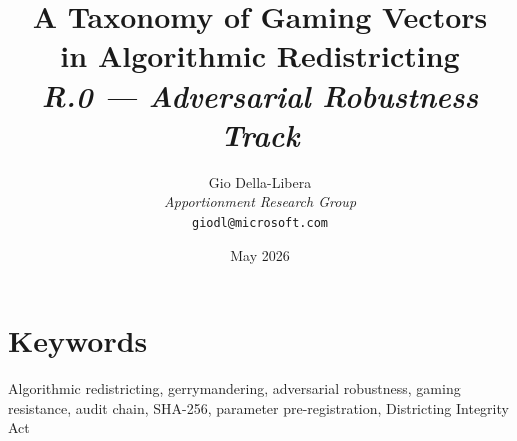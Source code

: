 \documentclass[12pt]{article}
\title{%
  \textbf{A Taxonomy of Gaming Vectors\\
  in Algorithmic Redistricting}\\[0.8em]
  \normalsize\textit{R.0 --- Adversarial Robustness Track}%
}
\author{%
  Gio Della-Libera\\
  \textit{Apportionment Research Group}\\
  \small\texttt{giodl@microsoft.com}
}
\date{May 2026}
\begin{document}
\maketitle

\begin{abstract}

\end{abstract}

\section*{Keywords}
Algorithmic redistricting, gerrymandering, adversarial robustness,
gaming resistance, audit chain, SHA-256, parameter pre-registration,
Districting Integrity Act

\tableofcontents
\newpage













\end{document}
